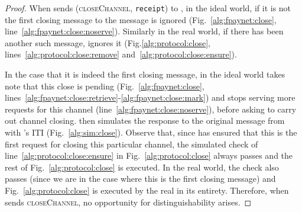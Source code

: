 \begin{proof}
  When \environment{} sends (\textsc{closeChannel}, \texttt{receipt}) to \alice,
  in the ideal world, if it is not the first closing message to \alice{} the
  message is ignored (Fig.~\ref{alg:fpaynet:close},
  line~\ref{alg:fpaynet:close:noserve}). Similarly in the real world, if there
  has been another such message, \alice{} ignores it
  (Fig.\ref{alg:protocol:close}, lines~\ref{alg:protocol:close:remove}
  and~\ref{alg:protocol:close:ensure}).

  In the case that it is indeed the first closing message, in the ideal world
  \fpaynet{} takes note that this close is pending
  (Fig.~\ref{alg:fpaynet:close},
  lines~\ref{alg:fpaynet:close:retrieve}-\ref{alg:fpaynet:close:mark}) and stops
  serving more requests for this channel (line~\ref{alg:fpaynet:close:noserve}),
  before asking \simulator{} to carry out channel closing. \simulator{} then
  simulates the response to the original message from \environment{} with
  \alice's ITI (Fig.~\ref{alg:sim:close}). Observe that, since \fpaynet{} has
  ensured that this is the first request for closing this particular channel,
  the simulated check of line~\ref{alg:protocol:close:ensure} in
  Fig.~\ref{alg:protocol:close} always passes and the rest of
  Fig.~\ref{alg:protocol:close} is executed. In the real world, the check also
  passes (since we are in the case where this is the first closing message) and
  Fig.~\ref{alg:protocol:close} is executed by the real \alice{} in its
  entirety. Therefore, when \environment{} sends \textsc{closeChannel}, no
  opportunity for distinguishability arises.


\end{proof}
